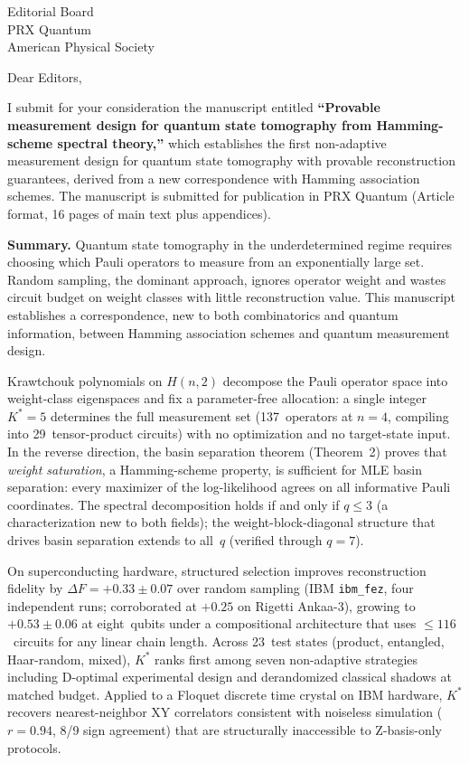 \documentclass[12pt]{letter}
\newcommand{\paragraph}[1]{\medskip\noindent\textbf{#1}\enspace}
\begin{document}
\begin{letter}{Editorial Board\\
PRX Quantum\\
American Physical Society}

\opening{Dear Editors,}

I submit for your consideration the manuscript entitled
\textbf{``Provable measurement design for quantum state tomography
from Hamming-scheme spectral theory,''}
which establishes the first non-adaptive measurement
design for quantum state tomography with provable
reconstruction guarantees, derived from a new
correspondence with Hamming association schemes.
The manuscript is submitted for publication in PRX Quantum
(Article format, 16 pages of main text plus appendices).

\paragraph{Summary.}
Quantum state tomography in the underdetermined regime requires
choosing which Pauli operators to measure from an exponentially
large set.
Random sampling, the dominant approach, ignores operator weight
and wastes circuit budget on weight classes with little
reconstruction value.
This manuscript establishes a correspondence, new to both
combinatorics and quantum information, between Hamming
association schemes and quantum measurement design.

Krawtchouk polynomials on $H(n,2)$ decompose the Pauli operator
space into weight-class eigenspaces and fix a parameter-free
allocation: a single integer $K^* = 5$ determines the full
measurement set (137~operators at $n = 4$, compiling into
29~tensor-product circuits) with no optimization and no
target-state input.
In the reverse direction, the basin separation theorem
(Theorem~2) proves that \emph{weight saturation}, a
Hamming-scheme property, is sufficient for MLE basin separation:
every maximizer of the log-likelihood agrees on all informative
Pauli coordinates.
The spectral decomposition holds if and only if $q \le 3$
(a characterization new to both fields); the
weight-block-diagonal structure that drives basin separation
extends to all~$q$ (verified through $q = 7$).

On superconducting hardware, structured selection improves
reconstruction fidelity by $\Delta F = +0.33 \pm 0.07$ over
random sampling (IBM \texttt{ibm\_fez}, four independent runs;
corroborated at $+0.25$ on Rigetti Ankaa-3), growing to
$+0.53 \pm 0.06$ at eight~qubits under a compositional
architecture that uses $\le 116$~circuits for any linear chain length.
Across 23~test states (product, entangled, Haar-random, mixed),
$K^*$ ranks first among seven non-adaptive strategies including
D-optimal experimental design and derandomized classical shadows
at matched budget.
Applied to a Floquet discrete time crystal on IBM hardware,
$K^*$ recovers nearest-neighbor XY correlators consistent with
noiseless simulation ($r = 0.94$, 8/9 sign agreement) that are
structurally inaccessible to Z-basis-only protocols.


\end{letter}
\end{document}
